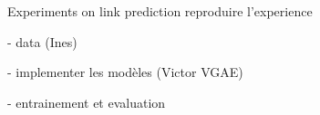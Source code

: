 \begin{frame}{Experiments on link prediction}
    reproduire l'experience 
  
    - data (Ines)
  
    - implementer les modèles (Victor VGAE)
  
    - entrainement et evaluation 
  
  \end{frame}
